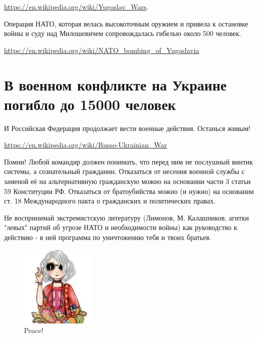 \documentclass[10pt,a4paper]{article}
\begin{document}
\href{https://en.wikipedia.org/wiki/Yugoslav\_Wars}
{https://en.wikipedia.org/wiki/Yugoslav\_Wars}.

Операция НАТО, которая велась высокоточным оружием и привела к остановке войны
и суду над Милошевичем сопровождалась гибелью около 500 человек.

\href{https://en.wikipedia.org/wiki/NATO\_bombing\_of\_Yugoslavia}
{https://en.wikipedia.org/wiki/NATO\_bombing\_of\_Yugoslavia}

\section{В военном конфликте на Украине погибло до 15000 человек}

И Российская Федерация продолжает вести военные действия. Останься живым!

\href{https://en.wikipedia.org/wiki/Russo-Ukrainian\_War}
{https://en.wikipedia.org/wiki/Russo-Ukrainian\_War}

Помни! Любой командир должен понимать, что перед ним не послушный винтик
системы, а сознательный гражданин.
Отказаться от несения военной службы с заменой её на
альтернативную гражданскую можно на основании части 3 статьи 59
Конституции РФ.
Отказаться от братоубийства можно (и нужно) на основании ст. 18
Международного пакта о гражданских и политических правах.

Не воспринимай экстремистскую литературу (Лимонов, М. Калашников, агитки
"левых" партий об угрозе НАТО и необходимости войны) как руководство к
действию - в ней программа по уничтожению тебя и твоих братьев.

\begin{figure}[b]
  \centering
  \includegraphics[width=100pt]{./pacific_girl.png}
  \caption{Peace!}
  \label{fig:pacific_girl}
\end{figure}
\end{document}
